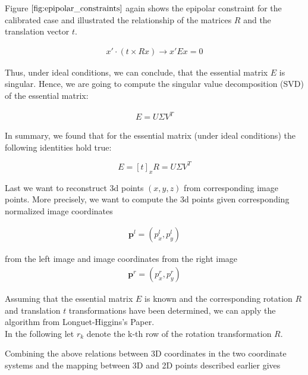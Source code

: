 \documentclass{paper}
\begin{document}
Figure $\ref{fig:epipolar_constraints}$ again shows the epipolar constraint for the calibrated case and illustrated the relationship of the matrices $R$ and the translation vector $t$. 

\begin{align}
    x' \cdot \left( t \times R x \right) \rightarrow x' E x = 0
\end{align}

Thus, under ideal conditions, we can conclude, that the essential matrix $E$ is singular. Hence, we are going to compute the singular value decomposition (SVD) of the essential matrix:

\begin{align}
    E = U \Sigma V^{T}
\end{align}

In summary, we found that for the essential matrix (under ideal conditions) the following identities hold true:

\begin{equation}
    E = [t]_x R = U \Sigma V^{T}
\end{equation}












Last we want to reconstruct 3d points $(x,y,z)$ from corresponding image points. More precisely, we want to compute the 3d points given corresponding normalized image coordinates 

\begin{align}
    \textbf{p}^{l} = (p^{l}_{x}, p^{l}_{y})
\end{align}

from the left image and image coordinates from the right image
\begin{align}
    \textbf{p}^{r} = (p^{r}_{x}, p^{r}_{y})
\end{align}

Assuming that the essential matrix $E$ is known and the corresponding rotation $R$ and translation $t$ transformations have been determined, we can apply the algorithm from Longuet-Higgins's Paper. \\

In the following let $r_k$ denote the k-th row of the rotation transformation $R$.



Combining the above relations between 3D coordinates in the two coordinate systems and the mapping between 3D and 2D points described earlier gives
\end{document}
